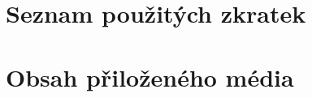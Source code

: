 \documentclass[thesis=B,czech,hidelinks]{dependencies/Thesis}
\begin{document}

\renewcommand{\thefigure}{\arabic{chapter}.\arabic{figure}}
\renewcommand{\figurename}{Obrázek}

\renewcommand{\thetable}{\arabic{chapter}.\arabic{table}}
\renewcommand{\tablename}{Tabulka}

\renewcommand{\thelisting}{\arabic{chapter}.\arabic{listing}}



\begin{introduction}
   
\end{introduction}










\begin{conclusion}
   
\end{conclusion}

\begin{literature}
   \printbibliography[heading=none]
\end{literature}



\appendix

\chapter{Seznam použitých zkratek}
\printglossary[type=\acronymtype,style=acronyms]

\chapter{Obsah přiloženého média}


\end{document}
